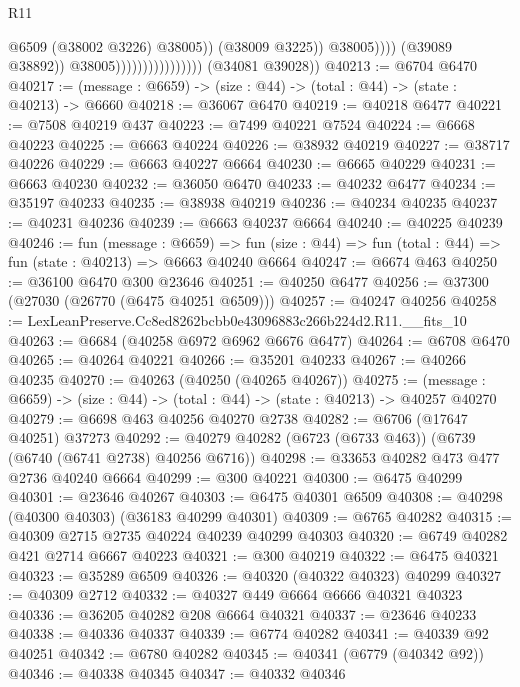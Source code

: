 \begin{lexlean}{R11}
\begin{coremodule}
                                                      @6509
                                                      (@38002 @3226)
                                                      @38005))
                                                  (@38009 @3225))
                                                @38005))))
                                        (@39089 @38892))
                                      @38005))))))))))))))))
      (@34081 @39028))
@40213 := @6704 @6470
@40217 := (message : @6659) -> (size : @44) -> (total : @44) -> (state : @40213) -> @6660
@40218 := @36067 @6470
@40219 := @40218 @6477
@40221 := @7508 @40219 @437
@40223 := @7499 @40221 @7524
@40224 := @6668 @40223
@40225 := @6663 @40224
@40226 := @38932 @40219
@40227 := @38717 @40226
@40229 := @6663 @40227 @6664
@40230 := @6665 @40229
@40231 := @6663 @40230
@40232 := @36050 @6470
@40233 := @40232 @6477
@40234 := @35197 @40233
@40235 := @38938 @40219
@40236 := @40234 @40235
@40237 := @40231 @40236
@40239 := @6663 @40237 @6664
@40240 := @40225 @40239
@40246 := fun (message : @6659) =>
  fun (size : @44) => fun (total : @44) => fun (state : @40213) => @6663 @40240 @6664
@40247 := @6674 @463
@40250 := @36100 @6470 @300 @23646
@40251 := @40250 @6477
@40256 := @37300 (@27030 (@26770 (@6475 @40251 @6509)))
@40257 := @40247 @40256
@40258 := LexLeanPreserve.Cc8ed8262bcbb0e43096883c266b224d2.R11.__fits_10
@40263 := @6684 (@40258 @6972 @6962 @6676 @6477)
@40264 := @6708 @6470
@40265 := @40264 @40221
@40266 := @35201 @40233
@40267 := @40266 @40235
@40270 := @40263 (@40250 (@40265 @40267))
@40275 := (message : @6659) -> (size : @44) -> (total : @44) -> (state : @40213) -> @40257 @40270
@40279 := @6698 @463 @40256 @40270 @2738
@40282 := @6706 (@17647 @40251) @37273
@40292 := @40279 @40282 (@6723 (@6733 @463)) (@6739 (@6740 (@6741 @2738) @40256 @6716))
@40298 := @33653 @40282 @473 @477 @2736 @40240 @6664
@40299 := @300 @40221
@40300 := @6475 @40299
@40301 := @23646 @40267
@40303 := @6475 @40301 @6509
@40308 := @40298 (@40300 @40303) (@36183 @40299 @40301)
@40309 := @6765 @40282
@40315 := @40309 @2715 @2735 @40224 @40239 @40299 @40303
@40320 := @6749 @40282 @421 @2714 @6667 @40223
@40321 := @300 @40219
@40322 := @6475 @40321
@40323 := @35289 @6509
@40326 := @40320 (@40322 @40323) @40299
@40327 := @40309 @2712
@40332 := @40327 @449 @6664 @6666 @40321 @40323
@40336 := @36205 @40282 @208 @6664 @40321
@40337 := @23646 @40233
@40338 := @40336 @40337
@40339 := @6774 @40282
@40341 := @40339 @92 @40251
@40342 := @6780 @40282
@40345 := @40341 (@6779 (@40342 @92))
@40346 := @40338 @40345
@40347 := @40332 @40346

\end{coremodule}
\end{lexlean}
